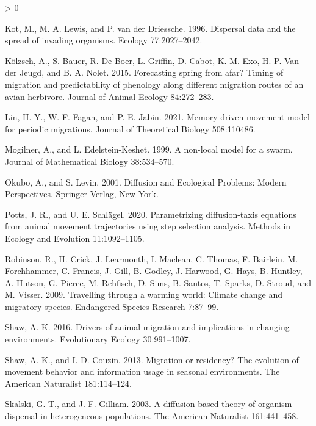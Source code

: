 \documentclass[12pt]{article}
\newlength{\cslhangindent}
\newenvironment{CSLReferences}[2] %
 {%
  \setlength{\parindent}{0pt}
  \ifodd #1 \everypar{\setlength{\hangindent}{\cslhangindent}}\ignorespaces\fi
  \ifnum #2 > 0
  \setlength{\parskip}{#2\baselineskip}
  \fi
 }%
 {}
\begin{document}
\begin{CSLReferences}{1}{0}
\leavevmode\hypertarget{ref-Kot1996}{}%
Kot, M., M. A. Lewis, and P. van der Driessche. 1996. Dispersal data and
the spread of invading organisms. Ecology 77:2027--2042.

\leavevmode\hypertarget{ref-Kolzsch2015}{}%
Kölzsch, A., S. Bauer, R. De Boer, L. Griffin, D. Cabot, K.-M. Exo, H.
P. Van der Jeugd, and B. A. Nolet. 2015. {Forecasting spring from afar?
Timing of migration and predictability of phenology along different
migration routes of an avian herbivore}. Journal of Animal Ecology
84:272--283.

\leavevmode\hypertarget{ref-Lin2021}{}%
Lin, H.-Y., W. F. Fagan, and P.-E. Jabin. 2021. Memory-driven movement
model for periodic migrations. Journal of Theoretical Biology
508:110486.

\leavevmode\hypertarget{ref-Mogilner1999}{}%
Mogilner, A., and L. Edelstein-Keshet. 1999. A non-local model for a
swarm. Journal of Mathematical Biology 38:534--570.

\leavevmode\hypertarget{ref-Okubo2001}{}%
Okubo, A., and S. Levin. 2001. {Diffusion and Ecological Problems:
Modern Perspectives}. Springer Verlag, New York.

\leavevmode\hypertarget{ref-Potts2020}{}%
Potts, J. R., and U. E. Schlägel. 2020. Parametrizing diffusion-taxis
equations from animal movement trajectories using step selection
analysis. Methods in Ecology and Evolution 11:1092--1105.

\leavevmode\hypertarget{ref-Robinson2009}{}%
Robinson, R., H. Crick, J. Learmonth, I. Maclean, C. Thomas, F.
Bairlein, M. Forchhammer, C. Francis, J. Gill, B. Godley, J. Harwood, G.
Hays, B. Huntley, A. Hutson, G. Pierce, M. Rehfisch, D. Sims, B. Santos,
T. Sparks, D. Stroud, and M. Visser. 2009. Travelling through a warming
world: Climate change and migratory species. Endangered Species Research
7:87--99.

\leavevmode\hypertarget{ref-Shaw2016}{}%
Shaw, A. K. 2016. Drivers of animal migration and implications in
changing environments. Evolutionary Ecology 30:991--1007.

\leavevmode\hypertarget{ref-Shaw2013}{}%
Shaw, A. K., and I. D. Couzin. 2013. Migration or residency? The
evolution of movement behavior and information usage in seasonal
environments. The American Naturalist 181:114--124.

\leavevmode\hypertarget{ref-Skalski2003}{}%
Skalski, G. T., and J. F. Gilliam. 2003. A diffusion-based theory of
organism dispersal in heterogeneous populations. The American Naturalist
161:441--458.


\end{CSLReferences}
\end{document}
